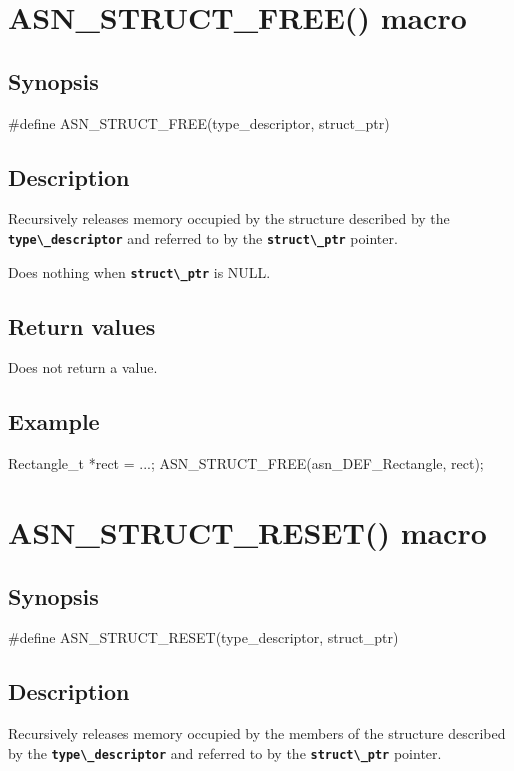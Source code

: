\documentclass[english,oneside,12pt]{book}
\newcommand{\apisection}[2]{\clearpage\section{\label{#1}#2}}
\newcommand{\code}[1]{\texttt{\textbf{\lstinline{#1}}}}
\begin{document}
\apisection{sec:ASN_STRUCT_FREE}{ASN\_STRUCT\_FREE() macro}

\subsection*{Synopsis}

\begin{signature}
#define ASN_STRUCT_FREE(type_descriptor, struct_ptr)
\end{signature}

\subsection*{Description}

Recursively releases memory occupied by the structure
described by the \code{type\_descriptor} and referred to
by the \code{struct\_ptr} pointer.

Does nothing when \code{struct\_ptr} is NULL.

\subsection*{Return values}
Does not return a value.

\subsection*{Example}

\begin{example}
Rectangle_t *rect = ...;
ASN_STRUCT_FREE(asn_DEF_Rectangle, rect);
\end{example}

\apisection{sec:ASN_STRUCT_RESET}{ASN\_STRUCT\_RESET() macro}

\subsection*{Synopsis}

\begin{signature}
#define ASN_STRUCT_RESET(type_descriptor, struct_ptr)
\end{signature}

\subsection*{Description}

Recursively releases memory occupied by the members of the structure
described by the \code{type\_descriptor} and referred to
by the \code{struct\_ptr} pointer.
\end{document}

